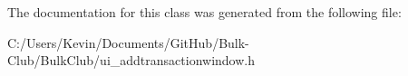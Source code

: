 The documentation for this class was generated from the following file\+:\begin{DoxyCompactItemize}
\item 
C\+:/\+Users/\+Kevin/\+Documents/\+Git\+Hub/\+Bulk-\/\+Club/\+Bulk\+Club/ui\+\_\+addtransactionwindow.\+h\end{DoxyCompactItemize}
